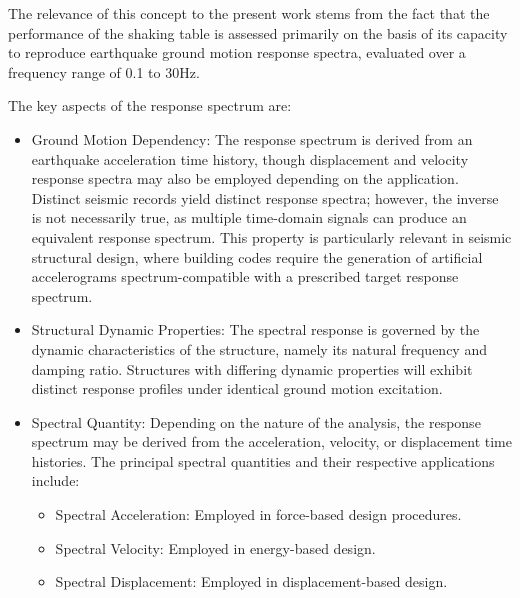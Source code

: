 \documentclass[  10pt, twoside]{report} %
\numberwithin{equation}{chapter}
\begin{document}
The relevance of this concept to the present work stems from the fact that the performance of the shaking table is assessed primarily on the basis of its capacity to reproduce earthquake ground motion response spectra, evaluated over a frequency range of 0.1 to 30Hz.

The key aspects of the response spectrum are:
\begin{itemize}[noitemsep, topsep=0pt, leftmargin=*]
    \item Ground Motion Dependency: The response spectrum is derived from an earthquake acceleration time history, though displacement and velocity response spectra may also be employed depending on the application. Distinct seismic records yield distinct response spectra; however, the inverse is not necessarily true, as multiple time-domain signals can produce an equivalent response spectrum. This property is particularly relevant in seismic structural design, where building codes require the generation of artificial accelerograms spectrum-compatible with a prescribed target response spectrum.
    \item Structural Dynamic Properties: The spectral response is governed by the dynamic characteristics of the structure, namely its natural frequency and damping ratio. Structures with differing dynamic properties will exhibit distinct response profiles under identical ground motion excitation.
    \item Spectral Quantity: Depending on the nature of the analysis, the response spectrum may be derived from the acceleration, velocity, or displacement time histories. The principal spectral quantities and their respective applications include:
    \begin{itemize}[noitemsep, topsep=0pt, leftmargin=*]
        \item Spectral Acceleration: Employed in force-based design procedures.
        \item Spectral Velocity: Employed in energy-based design.
        \item Spectral Displacement: Employed in displacement-based design.
    \end{itemize}
\end{itemize}
\end{document}
